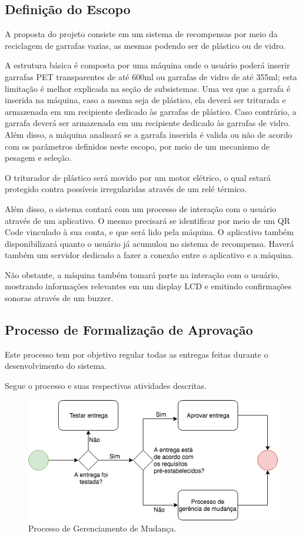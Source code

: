 \subsection{Definição do Escopo}
    A proposta do projeto consiste em um sistema de recompensas por meio da reciclagem de garrafas vazias, as mesmas podendo ser de plástico ou de vidro.

    A estrutura básica é composta por uma máquina onde o usuário poderá inserir garrafas PET transparentes de até 600ml ou garrafas de vidro de até 355ml; esta limitação é melhor explicada na seção de subsistemas. Uma vez que a garrafa é inserida na máquina, caso a mesma seja de plástico, ela deverá ser triturada e armazenada em um recipiente dedicado às garrafas de plástico. Caso contrário, a garrafa deverá ser armazenada em um recipiente dedicado às garrafas de vidro. Além disso, a máquina analisará se a garrafa inserida é valida ou não de acordo com os parâmetros definidos neste escopo, por meio de um mecanismo de pesagem e seleção.

    O triturador de plástico será movido por um motor elétrico, o qual estará protegido contra possíveis irregularidas através de um relé térmico. 

    Além disso, o sistema contará com um processo de interação com o usuário através de um aplicativo. O mesmo precisará se identificar por meio de um QR Code vinculado à sua conta, e que será lido pela máquina. O aplicativo também disponibilizará quanto o usuário já acumulou no sistema de recompensa. Haverá também um servidor dedicado a fazer a conexão entre o aplicativo e a máquina.

    Não obstante, a máquina também tomará parte na interação com o usuário, mostrando informações relevantes em um display LCD e emitindo confirmações sonoras através de um buzzer.

\subsection{Processo de Formalização de Aprovação}
    Este processo tem por objetivo regular todas as entregas feitas durante o desenvolvimento do sistema.

    Segue o processo e suas respectivas atividades descritas.

\begin{figure}[!ht]
	\centering
		\includegraphics[scale=0.7]{figuras/entrega}
	\caption{Processo de Gerenciamento de Mudança.}
\end{figure}

